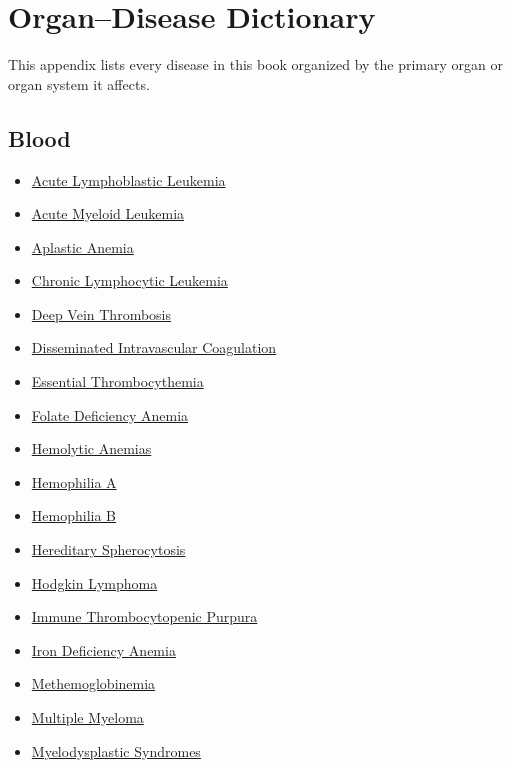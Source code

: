 \chapter*{Organ--Disease Dictionary}

This appendix lists every disease in this book organized by the primary
organ or organ system it affects.

\section*{Blood}
\label{sec:organ_blood}
\begin{itemize}[noitemsep]
  \item \hyperlink{sec:Acute Lymphoblastic Leukemia}{Acute Lymphoblastic Leukemia}
  \item \hyperlink{sec:Acute Myeloid Leukemia}{Acute Myeloid Leukemia}
  \item \hyperlink{sec:Aplastic Anemia}{Aplastic Anemia}
  \item \hyperlink{sec:Chronic Lymphocytic Leukemia}{Chronic Lymphocytic Leukemia}
  \item \hyperlink{sec:Deep Vein Thrombosis}{Deep Vein Thrombosis}
  \item \hyperlink{sec:Disseminated Intravascular Coagulation}{Disseminated Intravascular Coagulation}
  \item \hyperlink{sec:Essential Thrombocythemia}{Essential Thrombocythemia}
  \item \hyperlink{sec:Folate Deficiency Anemia}{Folate Deficiency Anemia}
  \item \hyperlink{sec:Hemolytic Anemias}{Hemolytic Anemias}
  \item \hyperlink{sec:Hemophilia A}{Hemophilia A}
  \item \hyperlink{sec:Hemophilia B}{Hemophilia B}
  \item \hyperlink{sec:Hereditary Spherocytosis}{Hereditary Spherocytosis}
  \item \hyperlink{sec:Hodgkin Lymphoma}{Hodgkin Lymphoma}
  \item \hyperlink{sec:Immune Thrombocytopenic Purpura}{Immune Thrombocytopenic Purpura}
  \item \hyperlink{sec:Iron Deficiency Anemia}{Iron Deficiency Anemia}
  \item \hyperlink{sec:Methemoglobinemia}{Methemoglobinemia}
  \item \hyperlink{sec:Multiple Myeloma}{Multiple Myeloma}
  \item \hyperlink{sec:Myelodysplastic Syndromes}{Myelodysplastic Syndromes}

\end{itemize}
